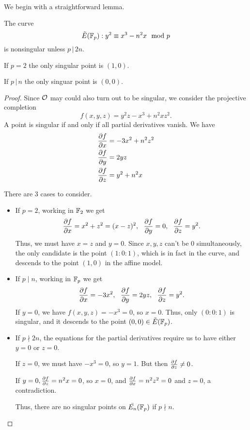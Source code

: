\documentclass[12pt, a4paper]{report}
\begin{document}
We begin with a straightforward lemma.

\begin{lemma} \label{singularity_condition}
  The curve
  \[ {\tilde{E}(\mathbb{F}_p)} : y^2 \equiv x^3 - n^2x \mod{p}\]
  is nonsingular unless $p \, | \, 2n$.

  If $p = 2$ the only singular point is $(1,0)$.

  If $p \, | \, n$ the only singuar point is $(0,0)$.

\end{lemma}

\begin{proof}
  Since ${\mathcal O}$ may could also turn out to be singular, we consider
  the projective completion
  \[f(x,y,z) = y^2z - x^3 + n^2 xz^2.\]
  A point is singular if and only if all partial derivatives vanish.
  We have
  \begin{equation*}
    \begin{split}
      \frac{\partial f}{\partial x} &= -3x^2 + n^2z^2 \\
      \frac{\partial f}{\partial y} &= 2yz \\
      \frac{\partial f}{\partial z} &= y^2 + n^2x
    \end{split}
  \end{equation*}
 
  There are 3 cases to consider.
  
  \begin{itemize}
  \item If $p = 2$, working in $\mathbb{F}_2$ we get
    \[\frac{\partial f}{\partial x} = x^2+z^2 = (x-z)^2, \,\,\,\,
      \frac{\partial f}{\partial y} = 0, \,\,\,\,
      \frac{\partial f}{\partial z} = y^2.\]
    Thus, we must have $x = z$ and $ y = 0$. Since $x, y, z$ can't be 0
    simultaneously, the only candidate is the point $(1:0:1)$, which
    is in fact in the curve, and descends to the point $(1,0)$ in the
    affine model.
    
  \item If $p \mid n$, working in $\mathbb{F}_p$ we get
    \[  \frac{\partial f}{\partial x} = -3x^2, \,\,\,\,
        \frac{\partial f}{\partial y} = 2yz, \,\,\,\,
        \frac{\partial f}{\partial z} = y^2.
      \]
    If $y = 0$, we have $f(x,y,z) = -x^3 = 0$, so $x = 0$.
    Thus,  only $(0:0:1)$ is singular, and it descends to the point $(0,0) \in {\tilde{E}(\mathbb{F}_p)}$.

  \item If $p \nmid 2n$, the equations for the partial derivatives
    require us to have either $y = 0$ or $z = 0$.
   
    If $z = 0$, we must have $-x^3 = 0$, so $y = 1$. But then $\frac{\partial f}{\partial z}
    \neq 0$.

    If $y = 0, \frac{\partial f}{\partial z} = n^2x = 0$, so $x = 0$, and $\frac{\partial f}{\partial x} =
    n^2z^2 = 0$ and $ z = 0$, a contradiction.

    Thus, there are no singular points on $\bar{E_n}(\mathbb{F}_p)$ if $p \nmid n$. \qedhere
  \end{itemize}
\end{proof}
\end{document}
